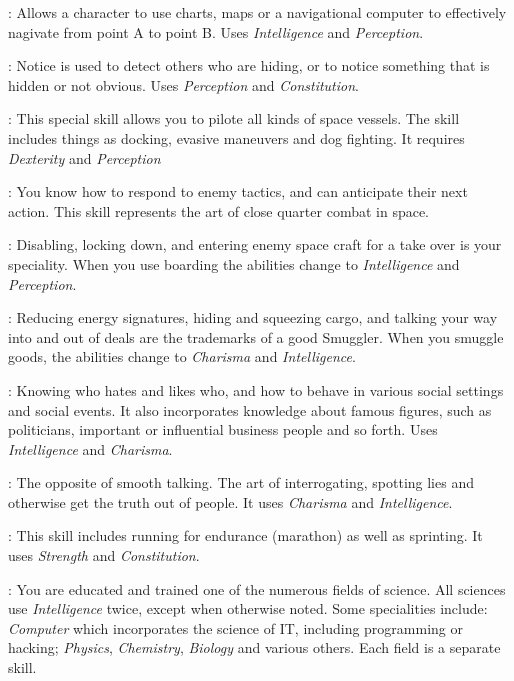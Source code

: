 : Allows a character to use charts, maps or a navigational
computer to effectively nagivate from point A to point B. Uses
\emph{Intelligence} and \emph{Perception}.

: Notice is used to detect others who are hiding, or to notice
something that is hidden or not obvious. Uses \emph{Perception} and
\emph{Constitution}.

: This special skill allows you to pilote all
kinds of space vessels. The skill includes things as docking, evasive maneuvers
and dog fighting. It requires \emph{Dexterity} and \emph{Perception}

: You know how to respond to
enemy tactics, and can anticipate their next action. This skill represents the
art of close quarter combat in space.

: Disabling, locking down, and
entering enemy space craft for a take over is your speciality. When you use
boarding the abilities change to \emph{Intelligence} and \emph{Perception}.

: Reducing energy signatures,
hiding and squeezing cargo, and talking your way into and out of deals are the
trademarks of a good Smuggler. When you smuggle goods, the abilities change to
\emph{Charisma} and \emph{Intelligence}.

: Knowing who hates and likes who, and how to behave in
various social settings and social events. It also incorporates knowledge about
famous figures, such as politicians, important or influential business people
and so forth. Uses \emph{Intelligence} and \emph{Charisma}.

: The opposite of smooth talking. The art of interrogating,
spotting lies and otherwise get the truth out of people. It uses \emph{Charisma}
and \emph{Intelligence}.

: This skill includes running for endurance (marathon) as well as
sprinting. It uses \emph{Strength} and \emph{Constitution}.

: You are educated and trained one of the numerous
fields of science. All sciences use \emph{Intelligence} twice, except when
otherwise noted. Some specialities include: \emph{Computer} which incorporates
the science of IT, including programming or hacking; \emph{Physics},
\emph{Chemistry}, \emph{Biology} and various others. Each field is a separate
skill.

